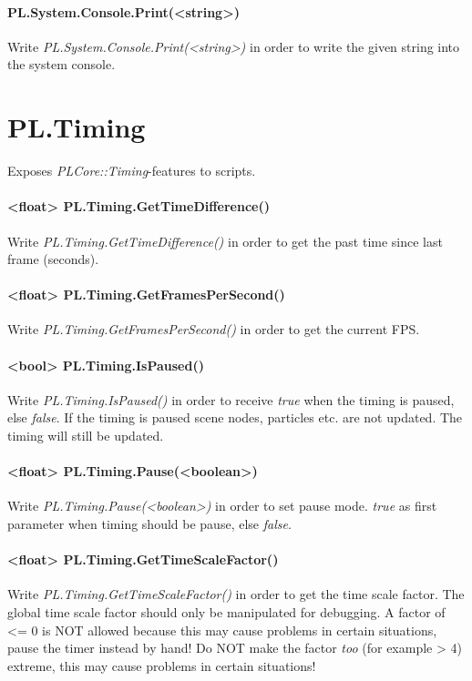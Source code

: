 \paragraph{PL.System.Console.Print(<string>)}
Write \emph{PL.System.Console.Print(<string>)} in order to write the given string into the system console.




\section{PL.Timing}
Exposes \emph{PLCore::Timing}-features to scripts.

\paragraph{<float> PL.Timing.GetTimeDifference()}
Write \emph{PL.Timing.GetTimeDifference()} in order to get the past time since last frame (seconds).

\paragraph{<float> PL.Timing.GetFramesPerSecond()}
Write \emph{PL.Timing.GetFramesPerSecond()} in order to get the current \ac{FPS}.

\paragraph{<bool> PL.Timing.IsPaused()}
Write \emph{PL.Timing.IsPaused()} in order to receive \emph{true} when the timing is paused, else \emph{false}. If the timing is paused scene nodes, particles etc. are not updated. The timing will still be updated.

\paragraph{<float> PL.Timing.Pause(<boolean>)}
Write \emph{PL.Timing.Pause(<boolean>)} in order to set pause mode. \emph{true} as first parameter when timing should be pause, else \emph{false}.

\paragraph{<float> PL.Timing.GetTimeScaleFactor()}
Write \emph{PL.Timing.GetTimeScaleFactor()} in order to get the time scale factor. The global time scale factor should only be manipulated for debugging. A factor of <= 0 is NOT allowed because this may cause problems in certain situations, pause the timer instead by hand! Do NOT make the factor \emph{too} (for example > 4) extreme, this may cause problems in certain situations!

